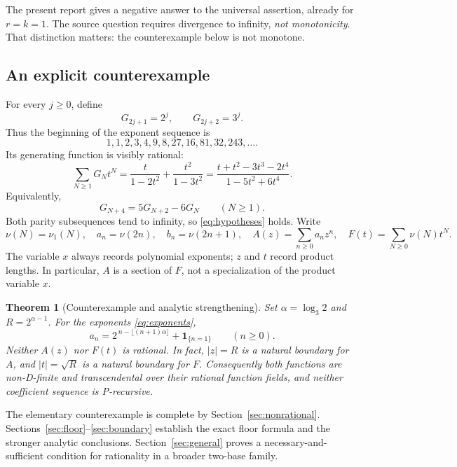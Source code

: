 \documentclass[11pt,letterpaper]{article}
\numberwithin{equation}{section}
\newtheorem{theorem}{Theorem}[section]
\theoremstyle{definition}
\theoremstyle{remark}
\newcommand{\ind}[1]{\boldsymbol{1}_{\{#1\}}}
\begin{document}
The present report gives a negative answer to the universal assertion,
already for $r=k=1$. The source question requires divergence to infinity,
\emph{not monotonicity}. That distinction matters: the counterexample below
is not monotone.

\subsection{An explicit counterexample}
For every $j\ge0$, define
\begin{equation}\label{eq:exponents}
 G_{2j+1}=2^j,\qquad G_{2j+2}=3^j.
\end{equation}
Thus the beginning of the exponent sequence is
\[
 1,1,2,3,4,9,8,27,16,81,32,243,\ldots.
\]
Its generating function is visibly rational:
\begin{equation}\label{eq:inputgf}
 \sum_{N\ge1}G_Nt^N
 =\frac{t}{1-2t^2}+\frac{t^2}{1-3t^2}
 =\frac{t+t^2-3t^3-2t^4}{1-5t^2+6t^4}.
\end{equation}
Equivalently,
\begin{equation}\label{eq:inputrec}
 G_{N+4}=5G_{N+2}-6G_N\qquad(N\ge1).
\end{equation}
Both parity subsequences tend to infinity, so \eqref{eq:hypotheses} holds.
Write
\begin{equation}\label{eq:ABF}
 \nu(N)=\nu_1(N),\quad a_n=\nu(2n),\quad b_n=\nu(2n+1),
 \quad A(z)=\sum_{n\ge0}a_nz^n,\quad F(t)=\sum_{N\ge0}\nu(N)t^N.
\end{equation}
The variable $x$ always records polynomial exponents; $z$ and $t$ record
product lengths. In particular, $A$ is a section of $F$, not a specialization
of the product variable $x$.

\begin{theorem}[Counterexample and analytic strengthening]\label{thm:main}
Set $\alpha=\log_3 2$ and $R=2^{\alpha-1}$. For the exponents
\eqref{eq:exponents},
\begin{equation}\label{eq:mainformula}
 a_n=2^{\,n-\lfloor(n+1)\alpha\rfloor}+\ind{n=1}\qquad(n\ge0).
\end{equation}
Neither $A(z)$ nor $F(t)$ is rational. In fact, $|z|=R$ is a natural boundary
for $A$, and $|t|=\sqrt R$ is a natural boundary for $F$. Consequently both
functions are non-D-finite and transcendental over their rational function
fields, and neither coefficient sequence is P-recursive.
\end{theorem}

The elementary counterexample is complete by Section~\ref{sec:nonrational}.
Sections~\ref{sec:floor}--\ref{sec:boundary} establish the exact floor formula
and the stronger analytic conclusions. Section~\ref{sec:general} proves a
necessary-and-sufficient condition for rationality in a broader two-base
family.
\end{document}
